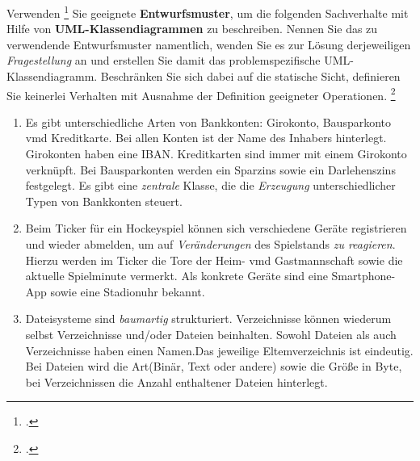 \documentclass{bschlangaul-aufgabe}
\begin{document}

Verwenden
\footcite{sosy:pu:4} Sie geeignete \textbf{Entwurfsmuster}, um die
folgenden Sachverhalte mit Hilfe von \textbf{UML-Klassendiagrammen} zu
beschreiben. Nennen Sie das zu verwendende Entwurfsmuster namentlich,
wenden Sie es zur Lösung derjeweiligen \emph{Fragestellung} an und
erstellen Sie damit das problemspezifische UML-Klassendiagramm.
Beschränken Sie sich dabei auf die statische Sicht, \dh definieren Sie
keinerlei Verhalten mit Ausnahme der Definition geeigneter Operationen.
\footcite[Seite 11]{examen:46116:2017:09}

\begin{enumerate}
\item Es gibt unterschiedliche Arten von Bankkonten: Girokonto,
Bausparkonto vmd Kreditkarte. Bei allen Konten ist der Name des Inhabers
hinterlegt. Girokonten haben eine IBAN. Kreditkarten sind immer mit
einem Girokonto verknüpft. Bei Bausparkonten werden ein Sparzins sowie
ein Darlehenszins festgelegt. Es gibt eine \emph{zentrale} Klasse, die
die \emph{Erzeugung} unterschiedlicher Typen von Bankkonten steuert.

\item Beim Ticker für ein Hockeyspiel können sich verschiedene Geräte
registrieren und wieder abmelden, um auf \emph{Veränderungen} des
Spielstands \emph{zu reagieren}. Hierzu werden im Ticker die Tore der
Heim- vmd Gastmannschaft sowie die aktuelle Spielminute vermerkt. Als
konkrete Geräte sind eine Smartphone-App sowie eine Stadionuhr bekannt.

\item Dateisysteme sind \emph{baumartig} strukturiert. Verzeichnisse
können wiederum selbst Verzeichnisse und/oder Dateien beinhalten. Sowohl
Dateien als auch Verzeichnisse haben einen Namen.Das jeweilige
Eltemverzeichnis ist eindeutig. Bei Dateien wird die Art(Binär, Text
oder andere) sowie die Größe in Byte, bei Verzeichnissen die Anzahl
enthaltener Dateien hinterlegt.

\end{enumerate}
\end{document}
